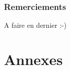 \documentclass[a4paper,12pt,twoside]{StyleThese}
\begin{document}



\setcounter{page}{0}
\cleardoublepage

\section*{Remerciements}

A faire en dernier :-)

\dominitoc
\tableofcontents



\mainmatter



\appendix

\cleardoublepage
\mtcaddpart[Annexes]
\part*{Annexes}






\end{document}
